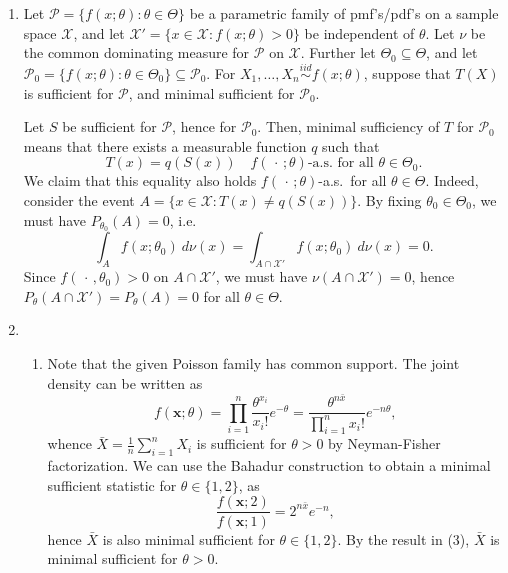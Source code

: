 \documentclass[11pt]{article}
\begin{document}
\begin{enumerate}
\begin{enumerate}
        \end{enumerate}


        \item Let $\mathcal{P} = \{f(x; \theta)\colon \theta \in \Theta\}$ be
        a parametric family of pmf's/pdf's on a sample space $\mathcal{X}$,
        and let $\mathcal{X}' = \{x \in \mathcal{X}\colon f(x; \theta) > 0\}$
        be independent of $\theta$.
        Let $\nu$ be the common dominating measure for $\mathcal{P}$ on
        $\mathcal{X}$.
        Further let $\Theta_0 \subseteq \Theta$, and let $\mathcal{P}_0 =
        \{f(x; \theta)\colon \theta \in \Theta_0\} \subseteq \mathcal{P}_0$.
        For $X_1, \dots, X_n \overset{iid}{\sim} f(x; \theta)$, suppose that
        $T(X)$ is sufficient for $\mathcal{P}$, and minimal sufficient for
        $\mathcal{P}_0$.

        Let $S$ be sufficient for $\mathcal{P}$, hence for $\mathcal{P}_0$.
        Then, minimal sufficiency of $T$ for $\mathcal{P}_0$ means that there
        exists a measurable function $q$ such that \[
            T(x) = q(S(x)) \quad f(\,\cdot\,; \theta)\text{-a.s. for all } \theta \in \Theta_0.
        \] We claim that this equality also holds $f(\,\cdot\,; \theta)$-a.s.\
        for all $\theta \in \Theta$.
        Indeed, consider the event $A = \{x \in \mathcal{X}\colon T(x) \neq
        q(S(x))\}$.
        By fixing $\theta_0 \in \Theta_0$, we must have $P_{\theta_0}(A)
        = 0$, i.e.\ \[
            \int_{A} f(x; \theta_0) \:d\nu(x) = \int_{A \cap \mathcal{X}'} f(x; \theta_0) \:d\nu(x) = 0.
        \] Since $f(\,\cdot\,, \theta_0) > 0$ on $A \cap \mathcal{X}'$, we
        must have $\nu(A \cap \mathcal{X}') = 0$, hence $P_\theta(A \cap
        \mathcal{X}') = P_\theta(A) = 0$ for all $\theta \in \Theta$.



        \item
        \begin{enumerate}
            \item Note that the given Poisson family has common support.
            The joint density can be written as \[
                f(\bm{x}; \theta)
                    = \prod_{i = 1}^n \frac{\theta^{x_i}}{x_i!} e^{-\theta}
                    = \frac{\theta^{n\bar{x}}}{\prod_{i = 1}^n x_i!} e^{-n\theta},
            \] whence $\bar{X} = \frac{1}{n}\sum_{i = 1}^n X_i$ is sufficient
            for $\theta > 0$ by Neyman-Fisher factorization.
            We can use the Bahadur construction to obtain a minimal sufficient
            statistic for $\theta \in \{1, 2\}$, as \[
                \frac{f(\bm{x}; 2)}{f(\bm{x}; 1)} = 2^{n\bar{x}} e^{-n},
            \] hence $\bar{X}$ is also minimal sufficient for $\theta \in \{1,
            2\}$.
            By the result in (3), $\bar{X}$ is minimal sufficient for $\theta
            > 0$.


\end{enumerate}
\end{enumerate}
\end{document}
